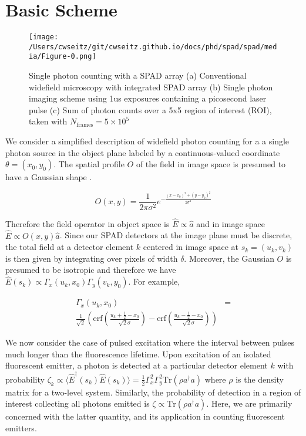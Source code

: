 \section{Basic Scheme}

\begin{figure*}[t]
\centering
\texttt{[image: /Users/cwseitz/git/cwseitz.github.io/docs/phd/spad/spad/media/Figure-0.png]}
\caption{Single photon counting with a SPAD array (a) Conventional widefield microscopy with integrated SPAD array (b) Single photon imaging scheme using 1us exposures containing a picosecond laser pulse (c) Sum of photon counts over a 5x5 region of interest (ROI), taken with $N_{\mathrm{frames}}=5\times 10^{5}$}
\end{figure*}    

We consider a simplified description of widefield photon counting for a a single photon source in the object plane labeled by a continuous-valued coordinate $\theta=(x_0,y_0)$. The spatial profile $O$ of the field in image space is presumed to have a Gaussian shape \parencite{Zhang2007,Richards1959,Gibson1989}.

\begin{equation}
O(x,y) = \frac{1}{2\pi\sigma^{2}}e^{-\frac{(x-x_{0})^2+(y-y_{0})^2}{2\sigma^2}}
\end{equation}

Therefore the field operator in object space is $\hat{E} \propto \hat{a}$ and in image space $\hat{E} \propto O(x,y)\hat{a}$. Since our SPAD detectors at the image plane must be discrete, the total field at a detector element $k$ centered in image space at $s_k=(u_k,v_k)$ is then given by integrating over pixels of width $\delta$. Moreover, the Gaussian $O$ is presumed to be isotropic and therefore we have $\hat{E}(s_k) \propto \Gamma_{x}(u_k,x_{0})\Gamma_{y}(v_k,y_0)$. For example,

\begin{align*}
\Gamma_{x}(u_k,x_{0}) &= \\ \frac{1}{\sqrt{2}}\left(\mathrm{erf}\left(\frac{u_k+\frac{1}{2}-x_{0}}{\sqrt{2}\sigma}\right) -\mathrm{erf}\left(\frac{u_k-\frac{1}{2}-x_0}{\sqrt{2}\sigma}\right)\right)
\end{align*}

We now consider the case of pulsed excitation where the interval between pulses much longer than the fluorescence lifetime. Upon excitation of an isolated fluorescent emitter, a photon is detected at a particular detector element $k$ with probability $\zeta_k \propto \langle \hat{E}^{\dagger}(s_k)\hat{E}(s_k)\rangle = \frac{1}{2}\Gamma_{x}^2 \Gamma_{y}^2\mathrm{Tr}(\rho a^{\dagger}a)$ where $\rho$ is the density matrix for a two-level system. Similarly, the probability of detection in a region of interest collecting all photons emitted is $\zeta\propto \mathrm{Tr}(\rho a^{\dagger}a)$. Here, we are primarily concerned with the latter quantity, and its application in counting fluorescent emitters.


